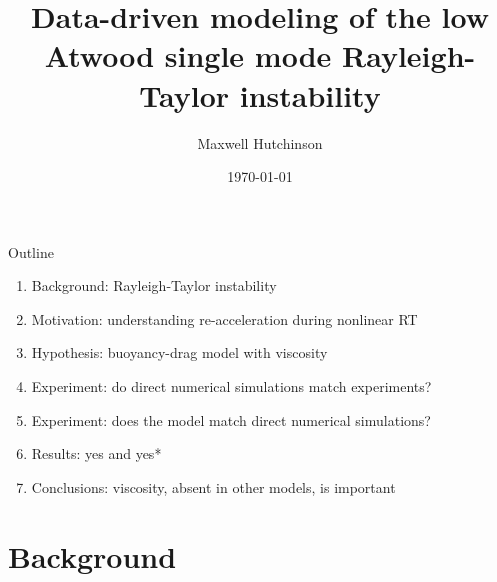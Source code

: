 \documentclass[12pt]{beamer}
\title[RTI Models]{
Data-driven modeling of the low Atwood single mode Rayleigh-Taylor instability
}
\author{Maxwell Hutchinson}
\institute[UofC]{University of Chicago}
\date{\today}
\begin{document}

\newcommand{\pder}[2] {\frac{\partial #1}{\partial #2}}
\newcommand{\ppder}[2] {\frac{\partial^2 #1}{\partial #2^2}}
\newcommand{\der}[2] {\frac{d #1}{d #2}}
\newcommand{\dder}[2] {\frac{d^2 #1}{d #2^2}}
 
\maketitle

\begin{frame}{Outline}
\begin{enumerate}
  \item Background: Rayleigh-Taylor instability
  \item Motivation: understanding re-acceleration during nonlinear RT
  \item Hypothesis: buoyancy-drag model with viscosity
  \item Experiment: do direct numerical simulations match experiments?
  \item Experiment: does the model match direct numerical simulations?
  \item Results: yes and yes*
  \item Conclusions: viscosity, absent in other models, is important
\end{enumerate}

\end{frame}

\section{Background}
\end{document}
